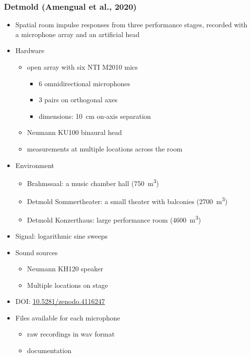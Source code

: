 \documentclass[14pt, legalpaper]{extarticle}
\begin{document}
\subsubsection{Detmold (Amengual et al., 2020)}

\begin{itemize}

\item Spatial room impulse responses from three performance stages, recorded with a microphone array and an artificial head \cite{amengual2020open}

\item Hardware
	\begin{itemize}
	\item open array with six NTI M2010 mics
		\begin{itemize}
		\item 6 omnidirectional microphones 
		\item 3 pairs on orthogonal axes	
		\item dimensions: \SI{10}{\centi\metre} on-axis separation
		\end{itemize}
	\item Neumann KU100 binaural head
	\item measurements at multiple locations across the room
	\end{itemize}

\item Environment
	\begin{itemize}
	\item Brahmssaal: a music chamber hall (\SI{750}{\cubic\metre})
	\item Detmold Sommertheater: a small theater with balconies (\SI{2700}{\cubic\metre})
	\item Detmold Konzerthaus: large performance room (\SI{4600}{\cubic\metre})
	\end{itemize}

\item Signal: logarithmic sine sweeps

\item Sound sources
	\begin{itemize}
	\item Neumann KH120 speaker
	\item Multiple locations on stage
	\end{itemize}

\item DOI: \href{https://zenodo.org/record/4116247}{10.5281/zenodo.4116247} 

\item Files available for each microphone
	\begin{itemize}
	\item raw recordings in wav format
	\item documentation
	\end{itemize}

\end{itemize}
\end{document}
